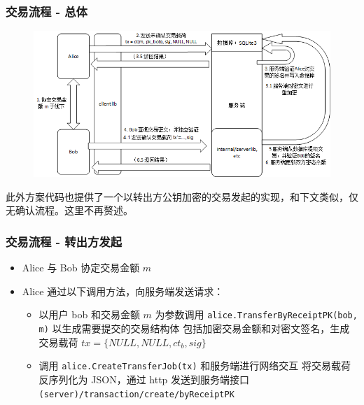 \begin{frame}
    \frametitle{交易流程 - 总体}

    \begin{figure}[h]
        \centering
        \includegraphics[width=0.75\linewidth]{figures/Tx-Abstract.png}
    \end{figure}

    此外方案代码也提供了一个以转出方公钥加密的交易发起的实现，和下文类似，仅无确认流程。这里不再赘述。
\end{frame}

\begin{frame}
    \frametitle{交易流程 - 转出方发起}

    \begin{itemize}
        \item Alice 与 Bob 协定交易金额 $m$
        \item Alice 通过以下调用方法，向服务端发送请求：
        \begin{itemize}
            \item 以用户 bob 和交易金额 $m$ 为参数调用 \texttt{alice.TransferByReceiptPK(bob, m)} 以生成需要提交的交易结构体 \newline 包括加密交易金额和对密文签名，生成交易载荷 $tx = \{NULL, NULL, ct_b, sig\}$
            \item 调用 \texttt{alice.CreateTransferJob(tx)} 和服务端进行网络交互 \newline 将交易载荷反序列化为 JSON，通过 http 发送到服务端接口 \texttt{(server)/transaction/create/byReceiptPK}
            
        \end{itemize}
    \end{itemize}

\end{frame}

